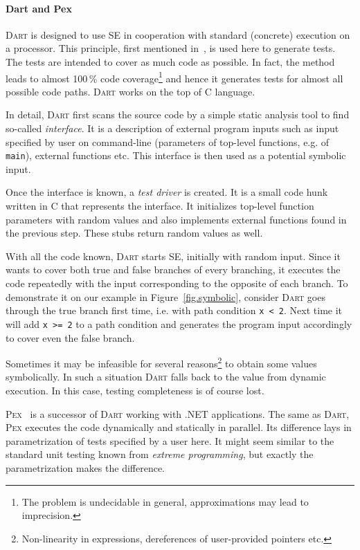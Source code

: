 \documentclass[11pt,a4paper]{article}
\begin{document}
\paragraph{Dart and Pex} \textsc{Dart} is designed to use SE in cooperation
with standard (concrete) execution on a processor. This principle, first
mentioned in~\cite{first_symb_dyn}, is used here to generate tests. The tests
are intended to cover as much code as possible. In fact, the method leads to
almost 100\,\% code coverage\footnote{The problem is undecidable in general,
approximations may lead to imprecision.} and hence it generates tests for
almost all possible code paths. \textsc{Dart} works on the top of C language.

In detail, \textsc{Dart} first scans the source code by a simple static
analysis tool to find so-called \emph{interface}. It is a description of
external program inputs such as input specified by user on command-line
(parameters of top-level functions, e.g. of \texttt{main}), external functions
etc. This interface is then used as a potential symbolic input.

Once the interface is known, a \emph{test driver} is created. It is a small
code hunk written in C that represents the interface. It initializes
top-level function parameters with random values and also implements external
functions found in the previous step. These stubs return random values as
well.

With all the code known, \textsc{Dart} starts SE, initially with random input.
Since it wants to cover both true and false branches of every branching, it
executes the code repeatedly with the input corresponding to the opposite
of each branch. To demonstrate it on our example in Figure~\ref{fig.symbolic},
consider \textsc{Dart} goes through the true branch first time, i.e. with path
condition \texttt{x < 2}. Next time it will add \texttt{x >= 2} to a path
condition and generates the program input accordingly to cover even the false
branch.

Sometimes it may be infeasible for several reasons\footnote{Non-linearity in
expressions, dereferences of user-provided pointers etc.} to obtain some values
symbolically. In such a situation \textsc{Dart} falls back to the value from
dynamic execution. In this case, testing completeness is of course lost.

\textsc{Pex}~\cite{pex} is a successor of \textsc{Dart} working with .NET
applications. The same as \textsc{Dart}, \textsc{Pex} executes the code
dynamically and statically in parallel. Its difference lays in parametrization
of tests specified by a user here. It might seem similar to the standard unit
testing known from \emph{extreme programming}, but exactly the parametrization
makes the difference.
\end{document}
